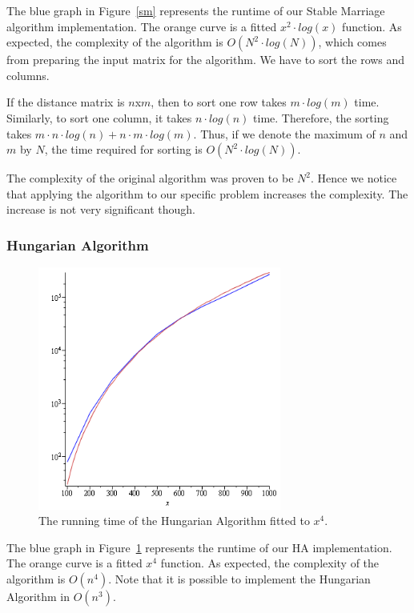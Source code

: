 \documentclass[a4paper,11pt]{article}
\begin{document}
The blue graph in Figure~\ref{sm} represents the runtime of our Stable Marriage algorithm implementation. The orange curve is a fitted $x^2 \cdot log(x)$ function. As expected, the complexity of the algorithm is $O(N^{2} \cdot log(N))$, which comes from preparing the input matrix for the algorithm. We have to sort the rows and columns.

  If the distance matrix is $n$x$m$, then to sort one row takes $m \cdot log(m)$ time. Similarly, to sort one column, it takes $n \cdot log(n)$ time. Therefore, the sorting takes $m \cdot n \cdot log(n) + n \cdot m \cdot log(m)$. Thus, if we denote the maximum of $n$ and $m$ by $N$, the time required for sorting is $O(N^{2} \cdot log(N))$. 

The complexity of the original algorithm was proven to be $N^{2}$. Hence we notice that applying the algorithm to our specific problem increases the complexity. The increase is not very significant though.

\subsubsection{Hungarian Algorithm}

\begin{figure}[ht!]
\centering 
\includegraphics[width=80mm]{HA_runtime.png}
\caption{The running time of the Hungarian Algorithm fitted to $x^4$.}
\label{hung} 
\end{figure}

The blue graph in Figure~\ref{hung} represents the runtime of our HA implementation. The orange curve is a fitted $x^4$ function. As expected, the complexity of the algorithm is $O(n^{4})$. Note that it is possible to implement the Hungarian Algorithm in $O(n^{3})$.
\end{document}
